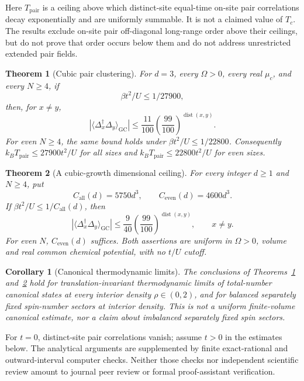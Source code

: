 \documentclass[11pt]{article}
\theoremstyle{plain}
\newtheorem{theorem}{Theorem}
\newtheorem{corollary}{Corollary}
\theoremstyle{remark}
\DeclareMathOperator{\dist}{dist}
\newcommand{\GC}{\mathrm{GC}}
\begin{document}
Here $T_{\mathrm{pair}}$ is a ceiling above which distinct-site equal-time
on-site pair correlations decay exponentially and are uniformly summable.
It is not a claimed value of $T_c$. The results exclude on-site pair
 off-diagonal long-range order above their ceilings, but do not prove that
order occurs below them and do not address unrestricted extended pair fields.

\begin{theorem}[Cubic pair clustering]\label{thm:cubic}
For $d=3$, every $\Omega>0$, every real $\mu_c$, and every $N\ge4$, if
\[
\beta t^2/U\le1/27900,
\]
then, for $x\ne y$,
\begin{equation}\label{eq:cubicdecay}
|\langle\Delta_x^\dagger\Delta_y\rangle_\GC|
\le\frac{11}{100}\left(\frac{99}{100}\right)^{\dist(x,y)}.
\end{equation}
For even $N\ge4$, the same bound holds under
$\beta t^2/U\le1/22800$.
Consequently $k_BT_{\mathrm{pair}}\le27900t^2/U$ for all sizes and
$k_BT_{\mathrm{pair}}\le22800t^2/U$ for even sizes.
\end{theorem}

\begin{theorem}[A cubic-growth dimensional ceiling]\label{thm:general}
For every integer $d\ge1$ and $N\ge4$, put
\[
C_{\mathrm{all}}(d)=5750d^3,\qquad C_{\mathrm{even}}(d)=4600d^3.
\]
If $\beta t^2/U\le1/C_{\mathrm{all}}(d)$, then
\begin{equation}\label{eq:generaldecay}
|\langle\Delta_x^\dagger\Delta_y\rangle_\GC|
\le\frac{9}{40}\left(\frac{99}{100}\right)^{\dist(x,y)},\qquad x\ne y.
\end{equation}
For even $N$, $C_{\mathrm{even}}(d)$ suffices. Both assertions are uniform in
$\Omega>0$, volume and real common chemical potential, with no $t/U$ cutoff.
\end{theorem}

\begin{corollary}[Canonical thermodynamic limits]\label{cor:canonical}
The conclusions of Theorems~\ref{thm:cubic} and~\ref{thm:general} hold for
translation-invariant thermodynamic limits of total-number canonical states
at every interior density $\rho\in(0,2)$, and for balanced separately fixed
spin-number sectors at interior density. This is not a uniform finite-volume
canonical estimate, nor a claim about imbalanced separately fixed spin sectors.
\end{corollary}

For $t=0$, distinct-site pair correlations vanish; assume $t>0$ in the
estimates below. The analytical arguments are supplemented by finite
exact-rational and outward-interval computer checks. Neither those checks nor
independent scientific review amount to journal peer review or formal
proof-assistant verification.
\end{document}
